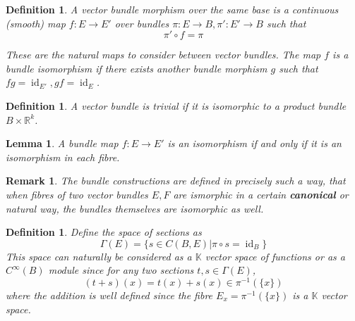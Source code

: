 \documentclass{article}
\numberwithin{theorem}{section}
\newtheorem{lemma}[theorem]{Lemma}
\newtheorem{definition}[theorem]{Definition}
\newtheorem*{remark}{Remark}
\newcommand{\K}{\mathbb{K}}
\newcommand{\R}{\mathbb{R}}
\newcommand{\1}{\mathds{1}}
\DeclareMathOperator{\id}{id}
\begin{document}
\begin{definition}
     A vector bundle morphism over the same base is a continuous (smooth) map $f : E \to E'$ over bundles $\pi: E \to B, \pi' : E' \to B$ such that 
     \[ \pi' \circ f = \pi  \] 
     \iffalse the diagram
    \[ \begin{tikzcd}
        E \arrow{rr}{f} \arrow{dr}{\pi} & & E' \arrow{dl}{\pi'} \\ 
          & B & \\  
    \end{tikzcd} 
        \]
    commutes. 
    \fi 
    These are the natural maps to consider between vector bundles. 
    The map $f$ is a  bundle isomorphism if there exists another bundle morphism $g$ such that $fg = \id_{E'}, gf = \id_{E}$. 
\end{definition}

\begin{definition}
    A vector bundle is trivial if it is isomorphic to a product bundle $B \times \R^k$. 
\end{definition}

\begin{lemma}
    A bundle map $f: E \to E'$ is an isomorphism if and only if it is an isomorphism in each fibre. 
\end{lemma}

\begin{remark}
    The bundle constructions are defined in precisely such a way, that when fibres of two vector bundles $E, F$ are ismorphic in a certain \textbf{canonical} or natural way, the bundles themselves are isomorphic as well. 
\end{remark}

\begin{definition}
    Define the space of sections as 
    \[ \Gamma(E) = \{ s \in C(B, E) | \pi \circ s = \id_B \} \] 
    This space can naturally be considered as a $\mathbb{K}$ vector space of functions or as a $C^\infty(B)$ module since for any two sections $t,s \in \Gamma(E)$,
    \[ (t+s)(x) = t(x) + s(x) \in \pi^{-1}(\{ x\} )\]
    where the addition is well defined since the fibre $E_x = \pi^{-1}(\{ x\} )$ is 
    a $\K$   vector space. 
\end{definition}
\end{document}
